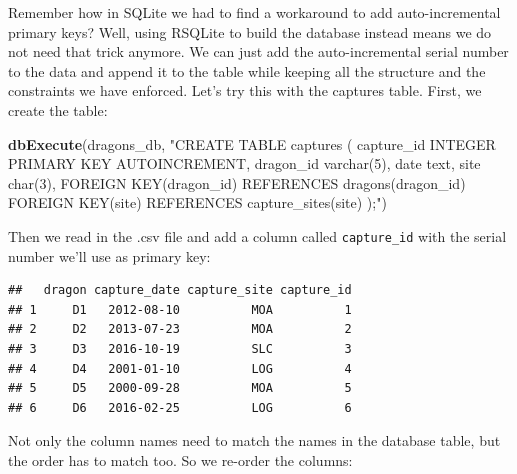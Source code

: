 \documentclass[
]{book}
\newenvironment{Shaded}{\begin{snugshade}}{\end{snugshade}}
\newcommand{\DecValTok}[1]{\textcolor[rgb]{0.00,0.00,0.81}{#1}}
\newcommand{\FunctionTok}[1]{\textcolor[rgb]{0.13,0.29,0.53}{\textbf{#1}}}
\newcommand{\NormalTok}[1]{#1}
\newcommand{\OtherTok}[1]{\textcolor[rgb]{0.56,0.35,0.01}{#1}}
\newcommand{\SpecialCharTok}[1]{\textcolor[rgb]{0.81,0.36,0.00}{\textbf{#1}}}
\newcommand{\StringTok}[1]{\textcolor[rgb]{0.31,0.60,0.02}{#1}}
\begin{document}
Remember how in SQLite we had to find a workaround to add auto-incremental
primary keys? Well, using RSQLite to build the database instead means we do not
need that trick anymore. We can just add the auto-incremental serial number to
the data and append it to the table while keeping all the structure and the
constraints we have enforced. Let's try this with the captures table. First, we
create the table:

\begin{Shaded}
\begin{Highlighting}[]
\FunctionTok{dbExecute}\NormalTok{(dragons\_db, }\StringTok{"CREATE TABLE captures (}
\StringTok{capture\_id INTEGER PRIMARY KEY AUTOINCREMENT,}
\StringTok{dragon\_id varchar(5),}
\StringTok{date text,}
\StringTok{site char(3),}
\StringTok{FOREIGN KEY(dragon\_id) REFERENCES dragons(dragon\_id)}
\StringTok{FOREIGN KEY(site) REFERENCES capture\_sites(site)}
\StringTok{);"}\NormalTok{)}
\end{Highlighting}
\end{Shaded}

Then we read in the .csv file and add a column called \texttt{capture\_id} with the
serial number we'll use as primary key:

\begin{Shaded}
\end{Shaded}

\begin{verbatim}
##   dragon capture_date capture_site capture_id
## 1     D1   2012-08-10          MOA          1
## 2     D2   2013-07-23          MOA          2
## 3     D3   2016-10-19          SLC          3
## 4     D4   2001-01-10          LOG          4
## 5     D5   2000-09-28          MOA          5
## 6     D6   2016-02-25          LOG          6
\end{verbatim}

Not only the column names need to match the names in the database table, but the
order has to match too. So we re-order the columns:
\end{document}
